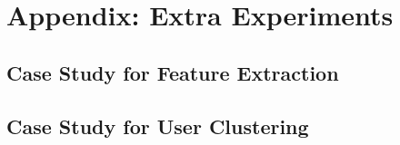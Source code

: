 \newpage
\section{Appendix: Extra Experiments}
\label{sec:appendix}

\subsection{Case Study for Feature Extraction}


\subsection{Case Study for User Clustering}